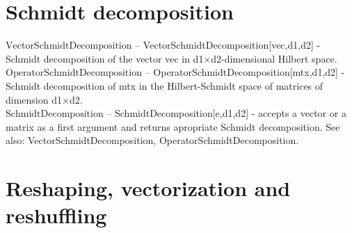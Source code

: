 \documentclass[a4paper,10pt]{scrartcl}
\begin{document}
\section{Schmidt decomposition}

\noindent\textbf{$ \text{VectorSchmidtDecomposition} $ }-- VectorSchmidtDecomposition[vec,d1,d2] - Schmidt decomposition of the vector vec in d1$\times $d2-dimensional Hilbert space.$  $\\[8pt]
\noindent\textbf{$ \text{OperatorSchmidtDecomposition} $ }-- OperatorSchmidtDecomposition[mtx,d1,d2] - Schmidt decomposition of mtx in the Hilbert-Schmidt space of matrices of dimension d1$\times $d2.$  $\\[8pt]
\noindent\textbf{$ \text{SchmidtDecomposition} $ }-- SchmidtDecomposition[e,d1,d2] - accepts a vector or a matrix as a first argument and returns apropriate Schmidt decomposition. See also: VectorSchmidtDecomposition, OperatorSchmidtDecomposition.$  $\\[8pt]
\section{Reshaping, vectorization and reshuffling}
\end{document}

